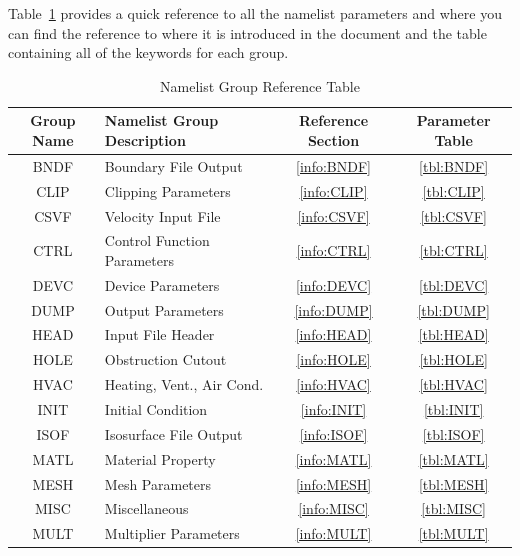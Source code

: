 \documentclass[11pt]{book}
\begin{document}
Table~\ref{tbl:namelistgroups} provides a quick reference to all the namelist parameters and
where you can find the reference to where it is introduced in the document and the
table containing all of the keywords for each group.

\vspace{\baselineskip}
\begin{table}[ht]
\begin{center}
\caption{Namelist Group Reference Table}
\label{tbl:namelistgroups}
\begin{tabular}{|c|l|c|c|}
\hline
Group Name  & Namelist Group Description& Reference Section & Parameter Table  \\ \hline
{\ct BNDF}  & Boundary File Output         & \ref{info:BNDF} & \ref{tbl:BNDF}  \\ \hline
{\ct CLIP}  & Clipping Parameters          & \ref{info:CLIP} & \ref{tbl:CLIP}  \\ \hline
{\ct CSVF}  & Velocity Input File          & \ref{info:CSVF} & \ref{tbl:CSVF}  \\ \hline
{\ct CTRL}  & Control Function Parameters  & \ref{info:CTRL} & \ref{tbl:CTRL}  \\ \hline
{\ct DEVC}  & Device Parameters            & \ref{info:DEVC} & \ref{tbl:DEVC}  \\ \hline
{\ct DUMP}  & Output Parameters            & \ref{info:DUMP} & \ref{tbl:DUMP}  \\ \hline
{\ct HEAD}  & Input File Header            & \ref{info:HEAD} & \ref{tbl:HEAD}  \\ \hline
{\ct HOLE}  & Obstruction Cutout           & \ref{info:HOLE} & \ref{tbl:HOLE}  \\ \hline
{\ct HVAC}  & Heating, Vent., Air Cond.    & \ref{info:HVAC} & \ref{tbl:HVAC}  \\ \hline
{\ct INIT}  & Initial Condition            & \ref{info:INIT} & \ref{tbl:INIT}  \\ \hline
{\ct ISOF}  & Isosurface File Output       & \ref{info:ISOF} & \ref{tbl:ISOF}  \\ \hline
{\ct MATL}  & Material Property            & \ref{info:MATL} & \ref{tbl:MATL}  \\ \hline
{\ct MESH}  & Mesh Parameters              & \ref{info:MESH} & \ref{tbl:MESH}  \\ \hline
{\ct MISC}  & Miscellaneous                & \ref{info:MISC} & \ref{tbl:MISC}  \\ \hline
{\ct MULT}  & Multiplier Parameters        & \ref{info:MULT} & \ref{tbl:MULT}  \\ \hline

\end{tabular}
\end{center}
\end{table}
\end{document}
